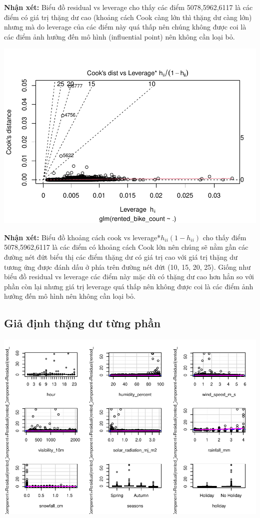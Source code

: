 \documentclass[
  11pt,
  letterpaper,
]{article}
\begin{document}
\textbf{Nhận xét:} Biểu đồ residual vs leverage cho thấy các điểm 5078,5962,6117 là các điểm có giá trị thặng dư cao (khoảng cách Cook càng lớn thì thặng dư càng lớn) nhưng mà do leverage của các điểm này quá thấp nên chúng không được coi là các điểm ảnh hưởng đến mô hình (influential point) nên không cần loại bỏ.

\begin{center}\includegraphics[width=1.2\linewidth,]{Final_Project_files/figure-latex/unnamed-chunk-38-1} \end{center}

\textbf{Nhận xét:} Biểu đồ khoảng cách cook vs leverage*\(h_{ii}(1 - h_{ii})\) cho thấy điểm 5078,5962,6117 là các điểm có khoảng cách Cook lớn nên chúng sẽ nằm gần các đường nét đứt biểu thị các điểm thặng dư có giá trị cao với giá trị thặng dư tương ứng được đánh dấu ở phía trên đường nét đứt (10, 15, 20, 25). Giống như biểu đồ residual vs leverage các điểm này mặc dù có thặng dư cao hơn hẳn so với phần còn lại nhưng giá trị leverage quá thấp nên không được coi là các điểm ảnh hưởng đến mô hình nên không cần loại bỏ.

\subsection{Giả định thặng dư từng phần}

\begin{center}\includegraphics[width=1.2\linewidth,]{Final_Project_files/figure-latex/unnamed-chunk-39-1} \end{center}
\end{document}

